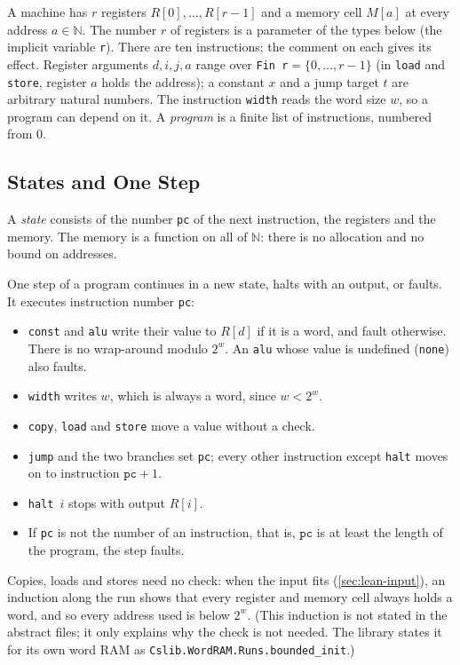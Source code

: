 \documentclass[11pt]{article}
\newcommand{\leanitem}[1]{\leansep\def\leansep{\vspace{2pt}}}
\newcommand{\leansnippet}[1]{\begin{leanbox}\def\leansep{}\let\do\leanitem\docsvlist{#1}\end{leanbox}}
\newcommand{\N}{\mathbb N}
\newcommand{\lean}[1]{\texttt{#1}}
\begin{document}
A machine has $r$ registers $R[0],\dots,R[r-1]$ and a memory cell $M[a]$ at every address
$a\in\N$.
The number $r$ of registers is a parameter of the types below (the implicit variable
\lean{r}).
There are ten instructions; the comment on each gives its effect.
Register arguments $d,i,j,a$ range over \lean{Fin r}${}=\{0,\dots,r-1\}$ (in \lean{load}
and \lean{store}, register $a$ holds the address); a constant $x$ and a jump target $t$ are
arbitrary natural numbers.
The instruction \lean{width} reads the word size $w$, so a program can depend on it.
A \emph{program} is a finite list of instructions, numbered from $0$.

\leansnippet{variable,Instr,Program}

\subsection{States and One Step}\label{sec:lean-step}

A \emph{state} consists of the number \lean{pc} of the next instruction, the registers and
the memory.
The memory is a function on all of $\N$: there is no allocation and no bound on addresses.

One step of a program continues in a new state, halts with an output, or faults.
It executes instruction number \lean{pc}:
\begin{itemize}
  \item \lean{const} and \lean{alu} write their value to $R[d]$ if it is a word, and fault
    otherwise. There is no wrap-around modulo $2^w$. An \lean{alu} whose value is undefined
    (\lean{none}) also faults.
  \item \lean{width} writes $w$, which is always a word, since $w<2^w$.
  \item \lean{copy}, \lean{load} and \lean{store} move a value without a check.
  \item \lean{jump} and the two branches set \lean{pc}; every other instruction except
    \lean{halt} moves on to instruction $\lean{pc}+1$.
  \item \lean{halt}~$i$ stops with output $R[i]$.
  \item If \lean{pc} is not the number of an instruction, that is, $\lean{pc}$ is at least
    the length of the program, the step faults.
\end{itemize}
Copies, loads and stores need no check: when the input fits (\cref{sec:lean-input}), an
induction along the run shows that every register and memory cell always holds a word, and
so every address used is below $2^w$.
(This induction is not stated in the abstract files; it only explains why the check is not
needed. The library states it for its own word RAM as \lean{Cslib.WordRAM.Runs.bounded\_init}.)
\end{document}

